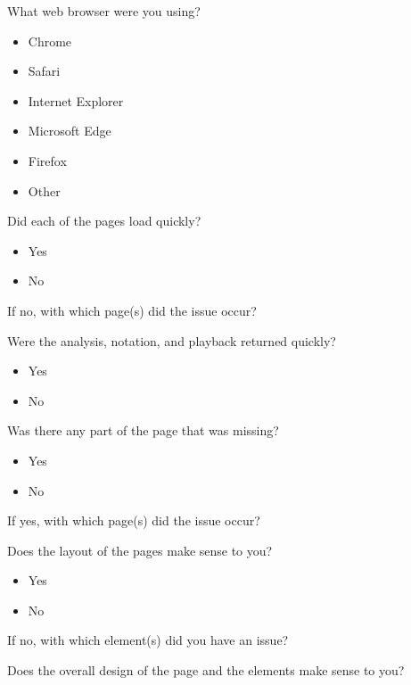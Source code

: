 \noindent What web browser were you using?

\begin{itemize}
	\item Chrome
	\item Safari
	\item Internet Explorer
	\item Microsoft Edge
	\item Firefox
	\item Other
\end{itemize}

\noindent Did each of the pages load quickly?

\begin{itemize}
	\item Yes
	\item No
\end{itemize}

\noindent If no, with which page(s) did the issue occur?

\vspace{\baselineskip}

\noindent Were the analysis, notation, and playback returned quickly?

\begin{itemize}
	\item Yes
	\item No
\end{itemize}

\noindent Was there any part of the page that was missing?

\begin{itemize}
	\item Yes
	\item No
\end{itemize}

\noindent If yes, with which page(s) did the issue occur?

\vspace{\baselineskip}

\noindent Does the layout of the pages make sense to you?

\begin{itemize}
	\item Yes
	\item No
\end{itemize}

\noindent If no, with which element(s) did you have an issue?

\vspace{\baselineskip}

\noindent Does the overall design of the page and the elements make sense to you?

